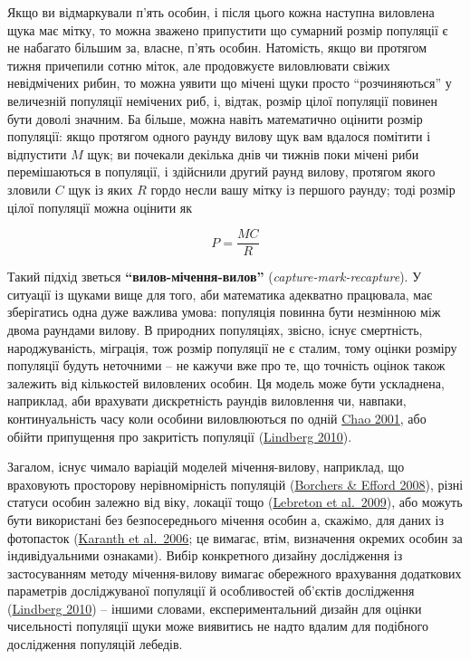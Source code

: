 \documentclass[
  11pt,
]{book}
\begin{document}
Якщо ви відмаркували п'ять особин, і після цього кожна наступна виловлена щука має мітку, то можна зважено припустити що сумарний розмір популяції є не набагато більшим за, власне, п'ять особин. Натомість, якщо ви протягом тижня причепили сотню міток, але продовжуєте виловлювати свіжих невідмічених рибин, то можна уявити що мічені щуки просто ``розчиняються'' у величезній популяції немічених риб, і, відтак, розмір цілої популяції повинен бути доволі значним. Ба більше, можна навіть математично оцінити розмір популяції: якщо протягом одного раунду вилову щук вам вдалося помітити і відпустити \(M\) щук; ви почекали декілька днів чи тижнів поки мічені риби перемішаються в популяції, і здійснили другий раунд вилову, протягом якого зловили \(C\) щук із яких \(R\) гордо несли вашу мітку із першого раунду; тоді розмір цілої популяції можна оцінити як

\[P = \frac{MC}{R}\]

Такий підхід зветься \textbf{``вилов-мічення-вилов''} (\emph{capture-mark-recapture}). У ситуації із щуками вище для того, аби математика адекватно працювала, має зберігатись одна дуже важлива умова: популяція повинна бути незмінною між двома раундами вилову. В природних популяціях, звісно, існує смертність, народжуваність, міграція, тож розмір популяції не є сталим, тому оцінки розміру популяції будуть неточними -- не кажучи вже про те, що точність оцінок також залежить від кількостей виловлених особин. Ця модель може бути ускладнена, наприклад, аби врахувати дискретність раундів виловлення чи, навпаки, континуальність часу коли особини виловлюються по одній \href{https://doi.org/10.1198/108571101750524670}{Chao 2001}, або обійти припущення про закритість популяції (\href{https://doi.org/10.1007/s10336-010-0533-9}{Lindberg 2010}).

Загалом, існує чимало варіацій моделей мічення-вилову, наприклад, що враховують просторову нерівномірність популяцій (\href{https://doi.org/10.1111/j.1541-0420.2007.00927.x}{Borchers \& Efford 2008}), різні статуси особин залежно від віку, локації тощо (\href{https://doi.org/10.1016/S0065-2504(09)00403-6}{Lebreton et al.~2009}), або можуть бути використані без безпосереднього мічення особин а, скажімо, для даних із фотопасток (\href{https://doi.org/10.1890/0012-9658(2006)87\%5B2925:ATPDUP\%5D2.0.CO;2}{Karanth et al.~2006}; це вимагає, втім, визначення окремих особин за індивідуальними ознаками). Вибір конкретного дизайну дослідження із застосуванням методу мічення-вилову вимагає обережного врахування додаткових параметрів досліджуваної популяції й особливостей об'єктів дослідження (\href{https://doi.org/10.1007/s10336-010-0533-9}{Lindberg 2010}) -- іншими словами, експериментальний дизайн для оцінки чисельності популяції щуки може виявитись не надто вдалим для подібного дослідження популяцій лебедів.
\end{document}
